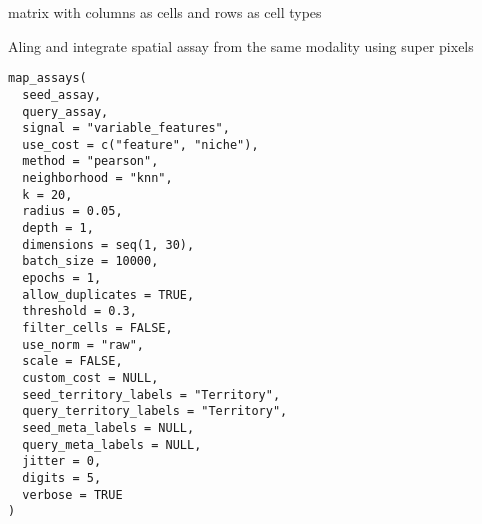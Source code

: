 \documentclass[a4paper]{book}
\begin{document}
%
\begin{Value}
matrix with columns as cells and rows as cell types
\end{Value}
%
\begin{Description}
Aling and integrate spatial assay from the same modality using super pixels
\end{Description}
%
\begin{Usage}
\begin{verbatim}
map_assays(
  seed_assay,
  query_assay,
  signal = "variable_features",
  use_cost = c("feature", "niche"),
  method = "pearson",
  neighborhood = "knn",
  k = 20,
  radius = 0.05,
  depth = 1,
  dimensions = seq(1, 30),
  batch_size = 10000,
  epochs = 1,
  allow_duplicates = TRUE,
  threshold = 0.3,
  filter_cells = FALSE,
  use_norm = "raw",
  scale = FALSE,
  custom_cost = NULL,
  seed_territory_labels = "Territory",
  query_territory_labels = "Territory",
  seed_meta_labels = NULL,
  query_meta_labels = NULL,
  jitter = 0,
  digits = 5,
  verbose = TRUE
)
\end{verbatim}
\end{Usage}
%
\end{document}
